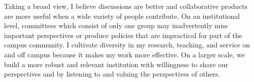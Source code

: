 \documentclass[12pt, letterpaper, sans]{moderncv}
\begin{document}
Taking a broad view, I believe discussions are better and collaborative products are more useful when a wide variety of people contribute. On an institutional level, committees which consist of only one group may inadvertently miss important perspectives or produce policies that are impractical for part of the campus community. I cultivate diversity in my research, teaching, and service on and off campus because it makes my work more effective. On a larger scale, we build a more robust and relevant institution with willingness to share our perspectives and by listening to and valuing the perspectives of others. 
\end{document}
